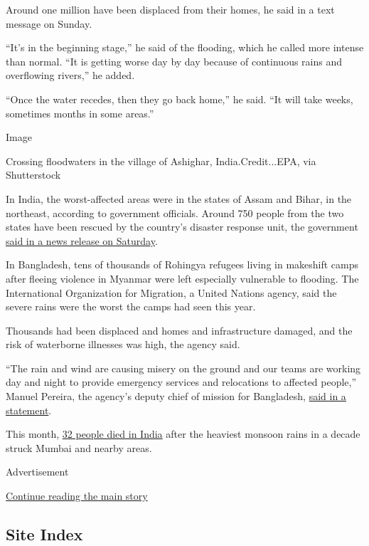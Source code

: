 Around one million have been displaced from their homes, he said in a
text message on Sunday.

``It's in the beginning stage,'' he said of the flooding, which he
called more intense than normal. ``It is getting worse day by day
because of continuous rains and overflowing rivers,'' he added.

``Once the water recedes, then they go back home,'' he said. ``It will
take weeks, sometimes months in some areas.''

Image

Crossing floodwaters in the village of Ashighar, India.Credit...EPA, via
Shutterstock

In India, the worst-affected areas were in the states of Assam and
Bihar, in the northeast, according to government officials. Around 750
people from the two states have been rescued by the country's disaster
response unit, the government
\href{https://mha.gov.in/sites/default/files/pressrelease_13072019.pdf}{said
in a news release on Saturday}.

In Bangladesh, tens of thousands of Rohingya refugees living in
makeshift camps after fleeing violence in Myanmar were left especially
vulnerable to flooding. The International Organization for Migration, a
United Nations agency, said the severe rains were the worst the camps
had seen this year.

Thousands had been displaced and homes and infrastructure damaged, and
the risk of waterborne illnesses was high, the agency said.

``The rain and wind are causing misery on the ground and our teams are
working day and night to provide emergency services and relocations to
affected people,'' Manuel Pereira, the agency's deputy chief of mission
for Bangladesh,
\href{https://www.iom.int/news/iom-scales-distribution-emergency-materials-rohingya-camps-are-battered-wind-rain}{said
in a statement}.

This month,
\href{https://www.nytimes.com/2019/07/02/world/asia/32-dead-as-worst-flooding-in-a-decade-hits-booming-mumbai.html}{32
people died in India} after the heaviest monsoon rains in a decade
struck Mumbai and nearby areas.

Advertisement

\protect\hyperlink{after-bottom}{Continue reading the main story}

\hypertarget{site-index}{%
\subsection{Site Index}\label{site-index}}

